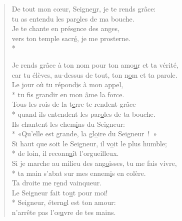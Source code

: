 
\begin{verse}
De tout mon cœur, Seigne\underline{u}r, je te rends grâce: \\
tu as entendu les par\underline{o}les de ma bouche. \\
Je te chante en prés\underline{e}nce des anges, \\
vers ton temple sacr\underline{é}, je me prosterne. \\*

Je rends grâce à ton nom pour ton amo\underline{u}r et ta vérité, \\
car tu élèves, au-dessus de tout, ton n\underline{o}m et ta parole. \\
Le jour où tu répond\underline{i}s à mon appel, \\*
tu fis grandir en mon \underline{â}me la force. \\

Tous les rois de la t\underline{e}rre te rendent grâce \\*
quand ils entendent les par\underline{o}les de ta bouche. \\
Ils chantent les chem\underline{i}ns du Seigneur: \\*
«Qu’elle est grande, la gl\underline{o}ire du Seigneur ! » \\

Si haut que soit le Seigneur, il v\underline{o}it le plus humble; \\*
de loin, il reconn\underline{a}ît l’orgueilleux. \\
Si je marche au milieu des ang\underline{o}isses, tu me fais vivre, \\*
ta main s’abat sur mes ennem\underline{i}s en colère. \\

Ta droite me r\underline{e}nd vainqueur. \\
Le Seigneur fait to\underline{u}t pour moi! \\*
Seigneur, étern\underline{e}l est ton amour: \\
n’arrête pas l’œ\underline{u}vre de tes mains. \\
\end{verse}

